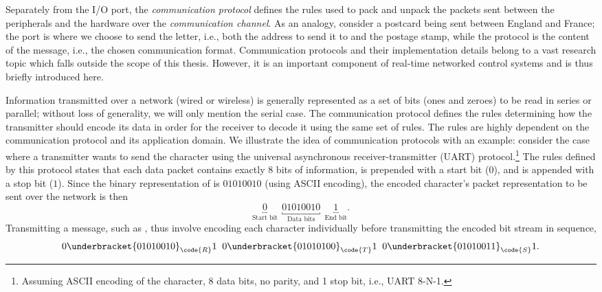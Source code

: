 Separately from the I/O port, the \emph{communication protocol} defines the rules used to pack and unpack the packets sent between the peripherals and the hardware over the \emph{communication channel}.
As an analogy, consider a postcard being sent between England and France; the port is where we choose to send the letter, i.e., both the address to send it to and the postage stamp, while the protocol is the content of the message, i.e., the chosen communication format.
Communication protocols and their implementation details belong to a vast research topic which falls outside the scope of this thesis.
However, it is an important component of real-time networked control systems and is thus briefly introduced here.

Information transmitted over a network (wired or wireless) is generally represented as a set of bits (ones and zeroes) to be read in series or parallel; without loss of generality, we will only mention the serial case.
The communication protocol defines the rules determining how the transmitter should encode its data in order for the receiver to decode it using the same set of rules.
The rules are highly dependent on the communication protocol and its application domain.
We illustrate the idea of communication protocols with an example: consider the case where a transmitter wants to send the character  using the universal asynchronous receiver-transmitter (UART) protocol.\footnote{Assuming ASCII encoding of the character, 8 data bits, no parity, and 1 stop bit, i.e., UART 8-N-1.}
The rules defined by this protocol states that each data packet contains exactly 8 bits of information, is prepended with a start bit ($0$), and is appended with a stop bit ($1$).
Since the binary representation of  is $01010010$ (using ASCII encoding), the encoded character's packet representation to be sent over the network is then
%
\begin{equation*}
    \underbracket{0}_{\text{Start bit}} \;\, \underbracket{01010010}_{\text{Data bits}} \;\, \underbracket{1}_{\text{End bit}}.
\end{equation*}
%
Transmitting a message, such as , thus involve encoding each character individually before transmitting the encoded bit stream in sequence,
%
\begin{equation*}
    0\underbracket{01010010}_{\code{R}}1 \;\;
    0\underbracket{01010100}_{\code{T}}1 \;\;
    0\underbracket{01010011}_{\code{S}}1.
\end{equation*}

